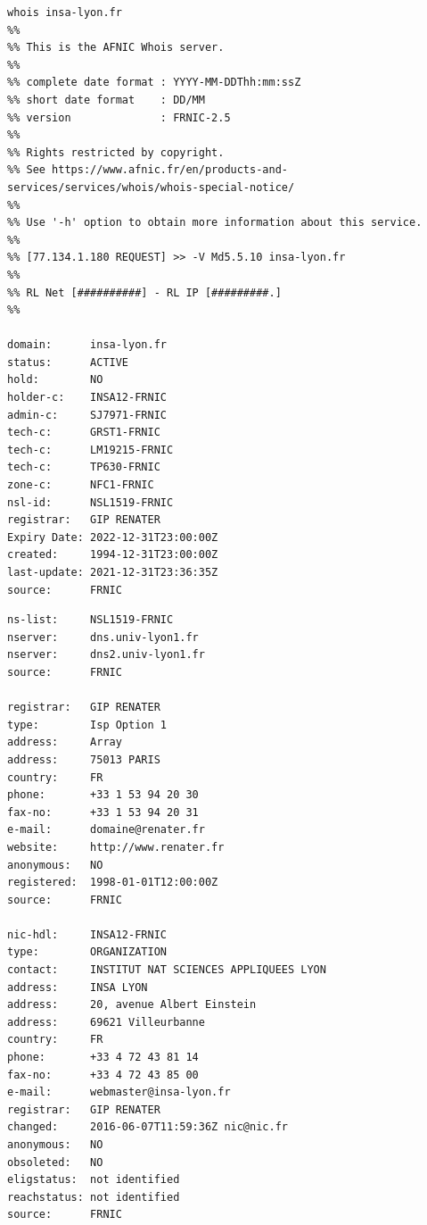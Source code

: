 \documentclass[
hyperref={pdfpagelabels=false}
,xcolor=table
]
{beamer}
\begin{document}
\begin{frame}[fragile]
  \begin{minipage}{.2\linewidth}
    {\tiny
\begin{verbatim}
whois insa-lyon.fr    
%%
%% This is the AFNIC Whois server.
%%
%% complete date format : YYYY-MM-DDThh:mm:ssZ
%% short date format    : DD/MM
%% version              : FRNIC-2.5
%%
%% Rights restricted by copyright.
%% See https://www.afnic.fr/en/products-and-services/services/whois/whois-special-notice/
%%
%% Use '-h' option to obtain more information about this service.
%%
%% [77.134.1.180 REQUEST] >> -V Md5.5.10 insa-lyon.fr
%%
%% RL Net [##########] - RL IP [#########.]
%%

domain:      insa-lyon.fr
status:      ACTIVE
hold:        NO
holder-c:    INSA12-FRNIC
admin-c:     SJ7971-FRNIC
tech-c:      GRST1-FRNIC
tech-c:      LM19215-FRNIC
tech-c:      TP630-FRNIC
zone-c:      NFC1-FRNIC
nsl-id:      NSL1519-FRNIC
registrar:   GIP RENATER
Expiry Date: 2022-12-31T23:00:00Z
created:     1994-12-31T23:00:00Z
last-update: 2021-12-31T23:36:35Z
source:      FRNIC
\end{verbatim}
    }
  \end{minipage}
\end{frame}


\begin{frame}[fragile]
  \begin{minipage}{.2\linewidth}
    {\tiny
\begin{verbatim}
ns-list:     NSL1519-FRNIC
nserver:     dns.univ-lyon1.fr
nserver:     dns2.univ-lyon1.fr
source:      FRNIC

registrar:   GIP RENATER
type:        Isp Option 1
address:     Array
address:     75013 PARIS
country:     FR
phone:       +33 1 53 94 20 30
fax-no:      +33 1 53 94 20 31
e-mail:      domaine@renater.fr
website:     http://www.renater.fr
anonymous:   NO
registered:  1998-01-01T12:00:00Z
source:      FRNIC

nic-hdl:     INSA12-FRNIC
type:        ORGANIZATION
contact:     INSTITUT NAT SCIENCES APPLIQUEES LYON
address:     INSA LYON
address:     20, avenue Albert Einstein
address:     69621 Villeurbanne
country:     FR
phone:       +33 4 72 43 81 14
fax-no:      +33 4 72 43 85 00
e-mail:      webmaster@insa-lyon.fr
registrar:   GIP RENATER
changed:     2016-06-07T11:59:36Z nic@nic.fr
anonymous:   NO
obsoleted:   NO
eligstatus:  not identified
reachstatus: not identified
source:      FRNIC
\end{verbatim}
    }
  \end{minipage}
\end{frame}
\end{document}
